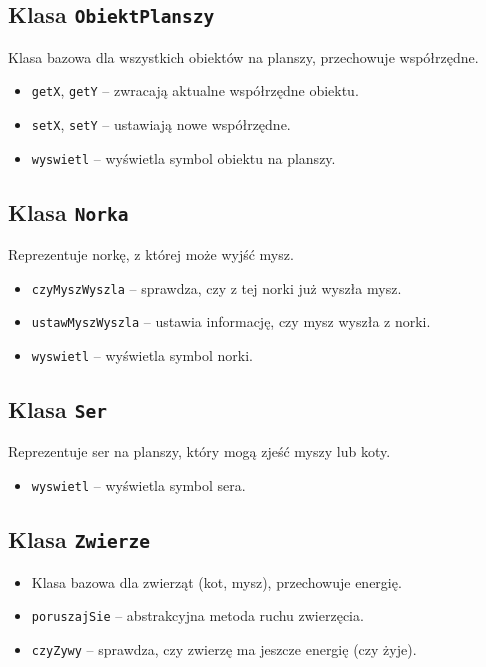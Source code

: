 \documentclass{article}
\begin{document}
\subsection*{Klasa \texttt{ObiektPlanszy}}
Klasa bazowa dla wszystkich obiektów na planszy, przechowuje współrzędne.
\begin{itemize}
  \item \texttt{getX}, \texttt{getY} -- zwracają aktualne współrzędne obiektu.
  \item \texttt{setX}, \texttt{setY} -- ustawiają nowe współrzędne.
  \item \texttt{wyswietl} -- wyświetla symbol obiektu na planszy.
\end{itemize}

\subsection*{Klasa \texttt{Norka}}
Reprezentuje norkę, z której może wyjść mysz.
\begin{itemize}
  \item \texttt{czyMyszWyszla} -- sprawdza, czy z tej norki już wyszła mysz.
  \item \texttt{ustawMyszWyszla} -- ustawia informację, czy mysz wyszła z norki.
  \item \texttt{wyswietl} -- wyświetla symbol norki.
\end{itemize}

\subsection*{Klasa \texttt{Ser}}
Reprezentuje ser na planszy, który mogą zjeść myszy lub koty.
\begin{itemize}
  \item \texttt{wyswietl} -- wyświetla symbol sera.
\end{itemize}

\subsection*{Klasa \texttt{Zwierze}}
\begin{itemize}
  \item Klasa bazowa dla zwierząt (kot, mysz), przechowuje energię.
  \item \texttt{poruszajSie} -- abstrakcyjna metoda ruchu zwierzęcia.
  \item \texttt{czyZywy} -- sprawdza, czy zwierzę ma jeszcze energię (czy żyje).
\end{itemize}
\end{document}
